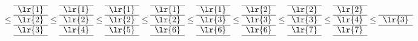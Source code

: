 \[
\le
\begin{array}[c]{*{1}c}\cline{1-1}
\lr{1}\\\cline{1-1}
\lr{2}\\\cline{1-1}
\lr{3}\\\cline{1-1}
\end{array}
\le
\begin{array}[c]{*{1}c}\cline{1-1}
\lr{1}\\\cline{1-1}
\lr{2}\\\cline{1-1}
\lr{4}\\\cline{1-1}
\end{array}
\le
\begin{array}[c]{*{1}c}\cline{1-1}
\lr{1}\\\cline{1-1}
\lr{2}\\\cline{1-1}
\lr{5}\\\cline{1-1}
\end{array}
\le
\begin{array}[c]{*{1}c}\cline{1-1}
\lr{1}\\\cline{1-1}
\lr{2}\\\cline{1-1}
\lr{6}\\\cline{1-1}
\end{array}
\le
\begin{array}[c]{*{1}c}\cline{1-1}
\lr{1}\\\cline{1-1}
\lr{3}\\\cline{1-1}
\lr{6}\\\cline{1-1}
\end{array}
\le
\begin{array}[c]{*{1}c}\cline{1-1}
\lr{2}\\\cline{1-1}
\lr{3}\\\cline{1-1}
\lr{6}\\\cline{1-1}
\end{array}
\le
\begin{array}[c]{*{1}c}\cline{1-1}
\lr{2}\\\cline{1-1}
\lr{3}\\\cline{1-1}
\lr{7}\\\cline{1-1}
\end{array}
\le
\begin{array}[c]{*{1}c}\cline{1-1}
\lr{2}\\\cline{1-1}
\lr{4}\\\cline{1-1}
\lr{7}\\\cline{1-1}
\end{array}
\le
\begin{array}[c]{*{1}c}\cline{1-1}
\lr{3}\\\cline{1-1}

\end{array}\]
